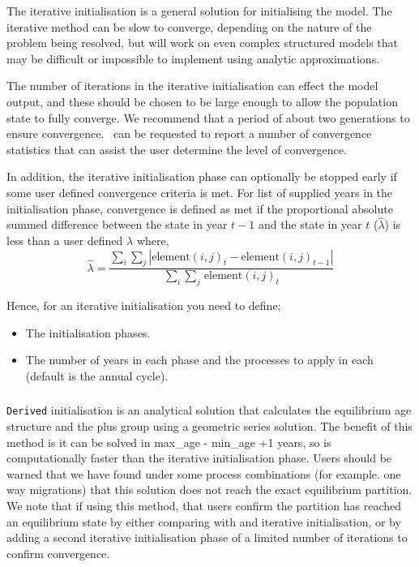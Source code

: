 The iterative initialisation is a general solution for initialising the model. The iterative method can be slow to converge, depending on the nature of the problem being resolved, but will work on even complex structured models that may be difficult or impossible to implement using analytic approximations. 

The number of iterations in the iterative initialisation can effect the model output, and these should be chosen to be large enough to allow the population state to fully converge. We recommend that a period of about two generations to ensure convergence. \CNAME\ can be requested to report a number of convergence statistics that can assist the user determine the level of convergence.

In addition, the iterative initialisation phase can optionally be stopped early if some user defined convergence criteria is met. For list of supplied years in the initialisation phase, convergence is defined as met if the proportional absolute summed difference between the state in year $t-1$ and the state in year $t$ ($\widehat{\lambda}$) is less than a user defined $\lambda$ where, 
\begin{equation}
  \widehat{\lambda} = \frac{\sum\limits_{i} \sum\limits_{j} \left|\text{element}(i,j)_t - \text{element}(i,j)_{t-1} \right|}{\sum\limits_{i} \sum\limits_{j} \frac{}{}\text{element}(i,j)_t}
\end{equation}

Hence, for an iterative initialisation you need to define;
\begin{itemize}
  \item The initialisation phases.
  \item The number of years in each phase and the processes to apply in each (default is the annual cycle).
\end{itemize}

\subsubsection*{}

\texttt{Derived} initialisation is an analytical solution that calculates the equilibrium age structure and the plus group using a geometric series solution. The benefit of this method is it can be solved in max\_age - min\_age +1 years, so is computationally faster than the iterative initialisation phase. Users should be warned that we have found under some process combinations (for example. one way migrations) that this solution does not reach the exact equilibrium partition. We note that if using this method, that users confirm the partition has reached an equilibrium state by either comparing with and iterative initialisation, or by adding a second iterative initialisation phase of a limited number of iterations to confirm convergence.

